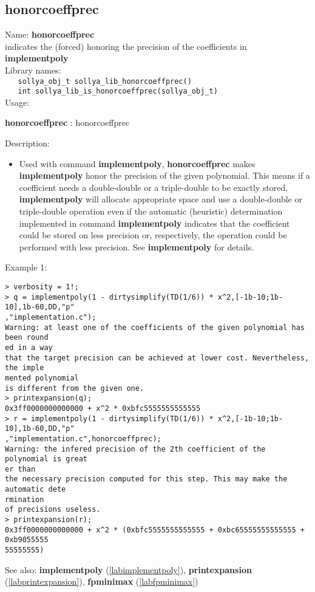\subsection{honorcoeffprec}
\label{labhonorcoeffprec}
\noindent Name: \textbf{honorcoeffprec}\\
\phantom{aaa}indicates the (forced) honoring the precision of the coefficients in \textbf{implementpoly}\\[0.2cm]
\noindent Library names:\\
\verb|   sollya_obj_t sollya_lib_honorcoeffprec()|\\
\verb|   int sollya_lib_is_honorcoeffprec(sollya_obj_t)|\\[0.2cm]
\noindent Usage: 
\begin{center}
\textbf{honorcoeffprec} : \textsf{honorcoeffprec}\\
\end{center}
\noindent Description: \begin{itemize}

\item Used with command \textbf{implementpoly}, \textbf{honorcoeffprec} makes \textbf{implementpoly} honor
   the precision of the given polynomial. This means if a coefficient
   needs a double-double or a triple-double to be exactly stored,
   \textbf{implementpoly} will allocate appropriate space and use a double-double
   or triple-double operation even if the automatic (heuristic)
   determination implemented in command \textbf{implementpoly} indicates that the
   coefficient could be stored on less precision or, respectively, the
   operation could be performed with less precision. See \textbf{implementpoly}
   for details.
\end{itemize}
\noindent Example 1: 
\begin{center}\begin{minipage}{15cm}\begin{Verbatim}[frame=single]
> verbosity = 1!;
> q = implementpoly(1 - dirtysimplify(TD(1/6)) * x^2,[-1b-10;1b-10],1b-60,DD,"p"
,"implementation.c");
Warning: at least one of the coefficients of the given polynomial has been round
ed in a way
that the target precision can be achieved at lower cost. Nevertheless, the imple
mented polynomial
is different from the given one.
> printexpansion(q);
0x3ff0000000000000 + x^2 * 0xbfc5555555555555
> r = implementpoly(1 - dirtysimplify(TD(1/6)) * x^2,[-1b-10;1b-10],1b-60,DD,"p"
,"implementation.c",honorcoeffprec);
Warning: the infered precision of the 2th coefficient of the polynomial is great
er than
the necessary precision computed for this step. This may make the automatic dete
rmination
of precisions useless.
> printexpansion(r);
0x3ff0000000000000 + x^2 * (0xbfc5555555555555 + 0xbc65555555555555 + 0xb9055555
55555555)
\end{Verbatim}
\end{minipage}\end{center}
See also: \textbf{implementpoly} (\ref{labimplementpoly}), \textbf{printexpansion} (\ref{labprintexpansion}), \textbf{fpminimax} (\ref{labfpminimax})
